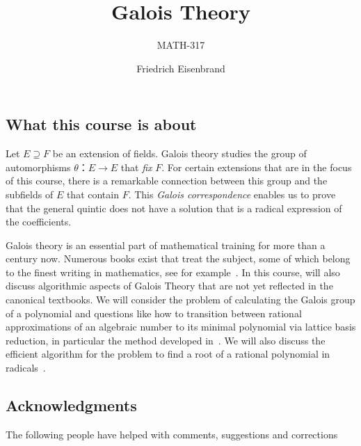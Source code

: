 \documentclass[a4paper,12pt,american]{scrbook}
\title{Galois Theory }
\subtitle{MATH-317}
\author{Friedrich Eisenbrand}
\theoremstyle{plain}
\theoremstyle{definition}
\begin{document}
 

\maketitle

\subsection*{What this course is about}
Let $E ⊇ F$ be an extension of fields. Galois theory studies the group of automorphisms $θ： E → E$ that \emph{fix} $F$. For certain extensions that are in the focus of this course, there is a remarkable connection between this group and the subfields of $E$ that contain $F$. This   \emph{Galois correspondence} enables us to  prove that the general quintic does not have a solution that is a radical expression of the coefficients.

Galois theory is an essential part of mathematical training for more than a century now. Numerous books exist that treat the subject, some of which belong to the finest writing in mathematics, see for example~\cite{van1950moderne,artin1942galois,nicholson2012introduction}. In this course,  will also discuss algorithmic aspects of Galois Theory that are not yet reflected in the canonical textbooks. We will consider the problem of calculating the Galois group of a polynomial and questions like how to transition between rational approximations of an algebraic number to its minimal polynomial via lattice basis reduction, in particular the method developed in~\cite{kannan1988polynomial}. We will also discuss the efficient algorithm for the problem to find a root of a rational polynomial in radicals~\cite{landau1985solvability}.



 \subsection*{Acknowledgments}
  The following people have helped with comments, suggestions and corrections





 \tableofcontents


 
  
  
 



\end{document}
